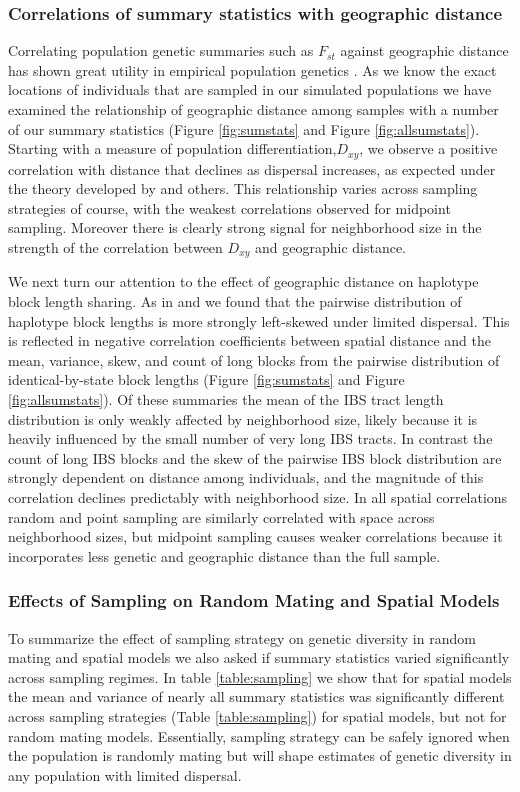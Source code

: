 \documentclass[10pt,twoside,lineno]{gsajnl}
\begin{document}
\subsubsection{Correlations of summary statistics with geographic distance}
Correlating population genetic summaries such as $F_{st}$ against geographic distance has shown great utility in empirical population genetics \citep{Rousset1997}. As we know the exact locations of individuals that are sampled in our simulated populations we have examined the relationship of geographic distance among samples with a number of our summary statistics (Figure \ref{fig:sumstats} and Figure \ref{fig:allsumstats}). Starting with a measure of population differentiation,$D_{xy}$, we observe a positive correlation with distance that declines as dispersal increases, as expected under the theory developed by \citep{Rousset1997} and others. This relationship varies across sampling strategies of course, with the weakest correlations observed for midpoint sampling. Moreover there is clearly strong signal for  neighborhood size in the strength of the correlation between $D_{xy}$ and geographic distance.

We next turn our attention to the effect of geographic distance on haplotype block length sharing. As in \citep{Ringbauer2017} and \citep{Baharian2016} we found that the pairwise distribution of haplotype block lengths is more strongly left-skewed under limited dispersal. This is reflected in negative correlation coefficients between spatial distance and the mean, variance, skew, and count of long blocks from the pairwise distribution of identical-by-state block lengths (Figure \ref{fig:sumstats} and Figure \ref{fig:allsumstats}). Of these summaries the mean of the IBS tract length distribution is only weakly affected by neighborhood size, likely because it is heavily influenced by the small number of very long IBS tracts. In contrast the count of long IBS blocks and the skew of the pairwise IBS block distribution are strongly dependent on distance among individuals, and the magnitude of this correlation declines predictably with neighborhood size. In all spatial correlations random and point sampling are similarly correlated with space across neighborhood sizes, but midpoint sampling causes weaker correlations because it incorporates less genetic and geographic distance than the full sample. 

\subsubsection{Effects of Sampling on Random Mating and Spatial Models}
To summarize the effect of sampling strategy on genetic diversity in random mating and spatial models we also asked if summary statistics varied significantly across sampling regimes. In table \ref{table:sampling} we show that for spatial models the mean and variance of nearly all summary statistics was significantly different across sampling strategies (Table \ref{table:sampling}) for spatial models, but not for random mating models. Essentially, sampling strategy can be safely ignored when the population is randomly mating but will shape estimates of genetic diversity in any population with limited dispersal. 
\end{document}
